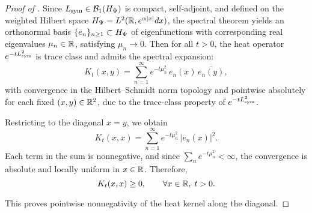 \begin{proof}[Proof of ]
Since \( L_{\mathrm{sym}} \in \mathcal{B}_1(H_{\Psi}) \) is compact, self-adjoint, and defined on the weighted Hilbert space \( H_{\Psi} = L^2(\mathbb{R}, e^{\alpha|x|} dx) \), the spectral theorem yields an orthonormal basis \( \{e_n\}_{n \geq 1} \subset H_{\Psi} \) of eigenfunctions with corresponding real eigenvalues \( \mu_n \in \mathbb{R} \), satisfying \( \mu_n \to 0 \). Then for all \( t > 0 \), the heat operator \( e^{-t L_{\mathrm{sym}}^2} \) is trace class and admits the spectral expansion:
\[
K_t(x,y) = \sum_{n=1}^\infty e^{-t \mu_n^2} \, e_n(x) \, \overline{e_n(y)},
\]
with convergence in the Hilbert--Schmidt norm topology and pointwise absolutely for each fixed \( (x,y) \in \mathbb{R}^2 \), due to the trace-class property of \( e^{-t L_{\mathrm{sym}}^2} \).

Restricting to the diagonal \( x = y \), we obtain
\[
K_t(x,x) = \sum_{n=1}^\infty e^{-t \mu_n^2} \, |e_n(x)|^2.
\]
Each term in the sum is nonnegative, and since \( \sum_{n} e^{-t \mu_n^2} < \infty \), the convergence is absolute and locally uniform in \( x \in \mathbb{R} \). Therefore,
\[
K_t(x,x) \geq 0, \qquad \forall x \in \mathbb{R}, \; t > 0.
\]

This proves pointwise nonnegativity of the heat kernel along the diagonal.
\end{proof}
